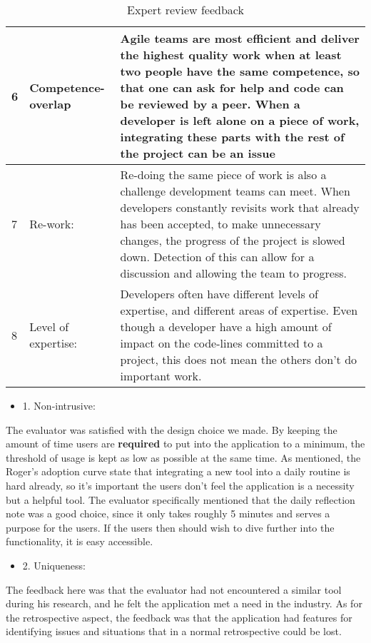 \begin{table}[H]
\begin{tabularx}{\textwidth}{|l|l|X|}
    6  & Competence-overlap  & Agile teams are most efficient and deliver the highest quality work when at least two people have the same competence, so that one can ask for help and code can be reviewed by a peer. When a developer is left alone on a piece of work, integrating these parts with the rest of the project can be an issue                                                 \\ \hline
    7  & Re-work:            & Re-doing the same piece of work is also a challenge development teams can meet. When developers constantly revisits work that already has been accepted, to make unnecessary changes, the progress of the project is slowed down. Detection of this can allow for a discussion and allowing the team to progress.                                              \\ \hline
    8  & Level of expertise: & Developers often have different levels of expertise, and different areas of expertise. Even though a developer have a high amount of impact on the code-lines committed to a project, this does not mean the others don't do important work.                                                                                                                    \\ \hline
    \end{tabularx}
    \caption {Expert review feedback}
    \label{experttable}
\end{table}

\clearpage

\begin{itemize}
    \item 1. Non-intrusive:
\end{itemize}
The evaluator was satisfied with the design choice we made. By keeping the amount of time users are \textbf{required} to put into the application to a minimum, the threshold of usage is kept as low as possible at the same time. As mentioned, the Roger's adoption curve state that integrating a new tool into a daily routine is hard already, so it's important the users don't feel the application is a necessity but a helpful tool. The evaluator specifically mentioned that the daily reflection note was a good choice, since it only takes roughly 5 minutes and serves a purpose for the users. If the users then should wish to dive further into the functionality, it is easy accessible. 

\begin{itemize}
    \item 2. Uniqueness: 
\end{itemize}
The feedback here was that the evaluator had not encountered a similar tool during his research, and he felt the application met a need in the industry. As for the retrospective aspect, the feedback was that the application had features for identifying issues and situations that in a normal retrospective could be lost.  

